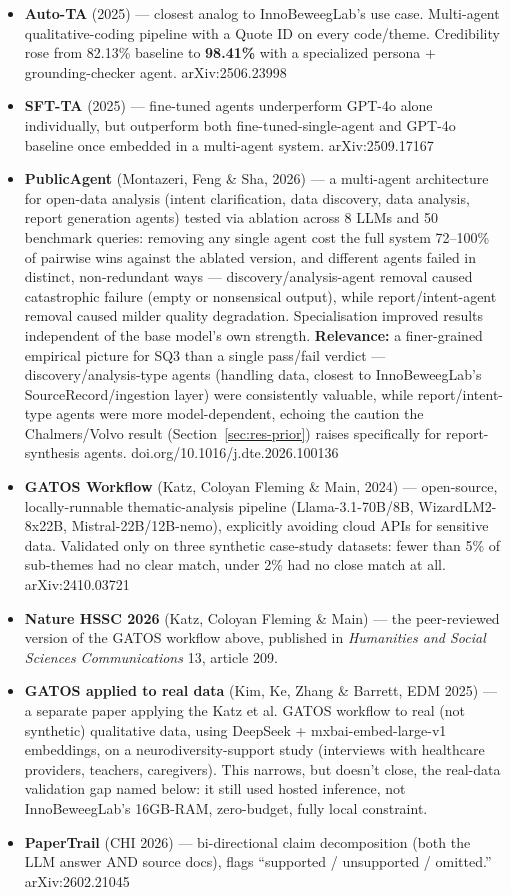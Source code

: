 \begin{itemize}
\item \textbf{Auto-TA} (2025) — closest analog to InnoBeweegLab's use case. Multi-agent qualitative-coding pipeline with a Quote ID on every code/theme. Credibility rose from 82.13\% baseline to \textbf{98.41\%} with a specialized persona + grounding-checker agent. arXiv:2506.23998
\item \textbf{SFT-TA} (2025) — fine-tuned agents underperform GPT-4o alone individually, but outperform both fine-tuned-single-agent and GPT-4o baseline once embedded in a multi-agent system. arXiv:2509.17167
\item \textbf{PublicAgent} (Montazeri, Feng \& Sha, 2026) — a multi-agent architecture for open-data analysis (intent clarification, data discovery, data analysis, report generation agents) tested via ablation across 8 LLMs and 50 benchmark queries: removing any single agent cost the full system 72–100\% of pairwise wins against the ablated version, and different agents failed in distinct, non-redundant ways — discovery/analysis-agent removal caused catastrophic failure (empty or nonsensical output), while report/intent-agent removal caused milder quality degradation. Specialisation improved results independent of the base model's own strength. \textbf{Relevance:} a finer-grained empirical picture for SQ3 than a single pass/fail verdict — discovery/analysis-type agents (handling data, closest to InnoBeweegLab's SourceRecord/ingestion layer) were consistently valuable, while report/intent-type agents were more model-dependent, echoing the caution the Chalmers/Volvo result (Section~\ref{sec:res-prior}) raises specifically for report-synthesis agents. doi.org/10.1016/j.dte.2026.100136
\item \textbf{GATOS Workflow} (Katz, Coloyan Fleming \& Main, 2024) — open-source, locally-runnable thematic-analysis pipeline (Llama-3.1-70B/8B, WizardLM2-8x22B, Mistral-22B/12B-nemo), explicitly avoiding cloud APIs for sensitive data. Validated only on three synthetic case-study datasets: fewer than 5\% of sub-themes had no clear match, under 2\% had no close match at all. arXiv:2410.03721
\item \textbf{Nature HSSC 2026} (Katz, Coloyan Fleming \& Main) — the peer-reviewed version of the GATOS workflow above, published in \textit{Humanities and Social Sciences Communications} 13, article 209.
\item \textbf{GATOS applied to real data} (Kim, Ke, Zhang \& Barrett, EDM 2025) — a separate paper applying the Katz et al. GATOS workflow to real (not synthetic) qualitative data, using DeepSeek + mxbai-embed-large-v1 embeddings, on a neurodiversity-support study (interviews with healthcare providers, teachers, caregivers). This narrows, but doesn't close, the real-data validation gap named below: it still used hosted inference, not InnoBeweegLab's 16GB-RAM, zero-budget, fully local constraint.
\item \textbf{PaperTrail} (CHI 2026) — bi-directional claim decomposition (both the LLM answer AND source docs), flags \textquotedblleft{}supported / unsupported / omitted.\textquotedblright{} arXiv:2602.21045
\end{itemize}

